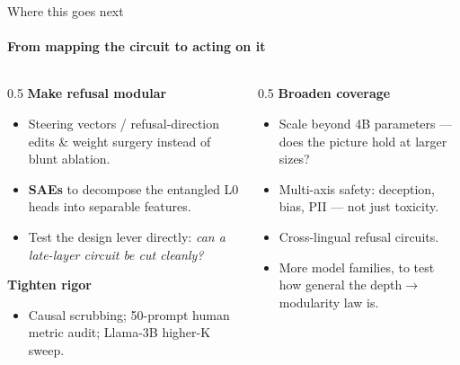 \documentclass[aspectratio=169]{beamer}
\newcommand{\hl}[1]{\textcolor{themeblue}{\textbf{#1}}}
\begin{document}
\begin{frame}{Where this goes next}
  \framesubtitle{From mapping the circuit to acting on it}
  \begin{columns}[T]
    \begin{column}{0.5\textwidth}
      \textbf{Make refusal modular}
      \begin{itemize}\footnotesize
        \item Steering vectors / refusal-direction edits \& weight surgery instead of blunt ablation.
        \item \hl{SAEs} to decompose the entangled L0 heads into separable features.
        \item Test the design lever directly: \emph{can a late-layer circuit be cut cleanly?}
      \end{itemize}
      \vspace{4pt}
      \textbf{Tighten rigor}
      \begin{itemize}\footnotesize
        \item Causal scrubbing; 50-prompt human metric audit; Llama-3B higher-K sweep.
      \end{itemize}
    \end{column}
    \begin{column}{0.5\textwidth}
      \textbf{Broaden coverage}
      \begin{itemize}\footnotesize
        \item Scale beyond 4B parameters --- does the picture hold at larger sizes?
        \item Multi-axis safety: deception, bias, PII --- not just toxicity.
        \item Cross-lingual refusal circuits.
        \item More model families, to test how general the depth$\rightarrow$modularity law is.
      \end{itemize}
    \end{column}
  \end{columns}
\end{frame}
\end{document}

